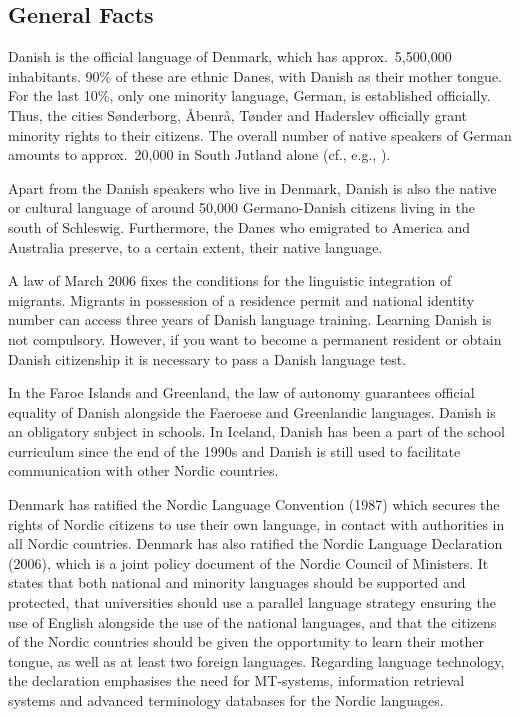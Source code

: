 \clearpage


\begin{multicols}{2}

\subsection{General Facts}


Danish is the official language of Denmark, which has approx.\ 5,500,000 inhabitants. 90\% of these are ethnic Danes, with Danish as their mother tongue. For the last 10\%, only one minority language, German, is established officially. Thus, the cities S\o nderborg, \mbox{\AA benr\aa}, T\o nder and Haderslev officially grant minority rights to their citizens. The overall number of native speakers of German amounts to approx.\ 20,000 in South Jutland alone (cf., e.g., \cite{Danmark}).  

Apart from the Danish speakers who live in Denmark, Danish is also the native or cultural language of around 50,000 Germano-Danish citizens living in the south of Schleswig. Furthermore, the Danes who emigrated to America and Australia preserve, to a certain extent, their native language.

A law of March 2006 fixes the conditions for the linguistic integration of migrants. Migrants in possession of a residence permit and national identity number can access three years of Danish language training. Learning Danish is not compulsory. However, if you want to become a permanent resident or obtain Danish citizenship it is necessary to pass a Danish language test.

In the Faroe Islands and Greenland, the law of autonomy guarantees official equality of Danish alongside the Faeroese and Greenlandic languages. Danish is an obligatory subject in schools. In Iceland, Danish has been a part of the school curriculum since the end of the 1990s and Danish is still used to facilitate communication with other Nordic countries. 

Denmark has ratified the Nordic Language Convention (1987) which secures the rights of Nordic citizens to use their own language, in contact with authorities in all Nordic countries.  Denmark has also ratified the Nordic Language Declaration (2006), which is a joint policy document of the Nordic Council of Ministers. It states that both national and minority languages should be supported and protected, that universities should use a parallel language strategy ensuring the use of English alongside the use of the national languages, and that the citizens of the Nordic countries should be given the opportunity to learn their mother tongue, as well as at least two foreign languages.  Regarding language technology, the declaration emphasises the need for MT-systems, information retrieval systems and advanced terminology databases for the Nordic languages.


\end{multicols}
